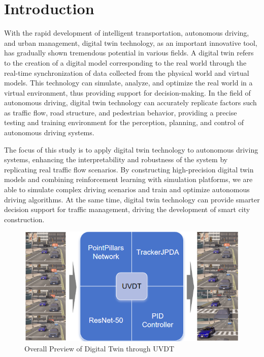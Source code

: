 \section{Introduction}
\label{sec:intro}

With the rapid development of intelligent transportation, autonomous driving, and urban management, digital twin technology, as an important innovative tool, has gradually shown tremendous potential in various fields\cite{Alpher17}. 
A digital twin refers to the creation of a digital model corresponding to the real world through the real-time synchronization of data collected from the physical world and virtual models\cite{Alpher20c}. 
This technology can simulate, analyze, and optimize the real world in a virtual environment, thus providing support for decision-making\cite{Alpher21b}. 
In the field of autonomous driving, digital twin technology can accurately replicate factors such as traffic flow, road structure, and pedestrian behavior, providing a precise testing and training environment for the perception, planning, and control of autonomous driving systems\cite{Alpher24}\cite{Alpher20d}.

The focus of this study is to apply digital twin technology to autonomous driving systems, enhancing the interpretability and robustness of the system by replicating real traffic flow scenarios\cite{Alpher24b}. 
By constructing high-precision digital twin models and combining reinforcement learning with simulation platforms, we are able to simulate complex driving scenarios and train and optimize autonomous driving algorithms\cite{Alpher22c}. 
At the same time, digital twin technology can provide smarter decision support for traffic management, driving the development of smart city construction\cite{Alpher17b}.

\begin{figure}[t]
	\centering
	\includegraphics[width=\linewidth]{picture/picture1.png} 
	\caption{Overall Preview of Digital Twin through UVDT} 
	\label{fig:example} 
\end{figure}


